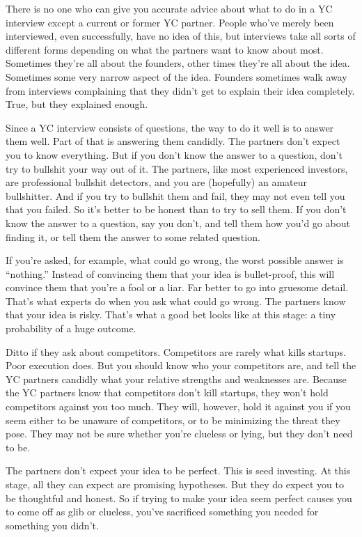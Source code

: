 There is no one who can give you accurate advice about what to do in a
YC interview except a current or former YC partner. People who've merely
been interviewed, even successfully, have no idea of this, but
interviews take all sorts of different forms depending on what the
partners want to know about most. Sometimes they're all about the
founders, other times they're all about the idea. Sometimes some very
narrow aspect of the idea. Founders sometimes walk away from interviews
complaining that they didn't get to explain their idea completely. True,
but they explained enough.

Since a YC interview consists of questions, the way to do it well is to
answer them well. Part of that is answering them candidly. The partners
don't expect you to know everything. But if you don't know the answer to
a question, don't try to bullshit your way out of it. The partners, like
most experienced investors, are professional bullshit detectors, and you
are (hopefully) an amateur bullshitter. And if you try to bullshit them
and fail, they may not even tell you that you failed. So it's better to
be honest than to try to sell them. If you don't know the answer to a
question, say you don't, and tell them how you'd go about finding it, or
tell them the answer to some related question.

If you're asked, for example, what could go wrong, the worst possible
answer is ``nothing.'' Instead of convincing them that your idea is
bullet-proof, this will convince them that you're a fool or a liar. Far
better to go into gruesome detail. That's what experts do when you ask
what could go wrong. The partners know that your idea is risky. That's
what a good bet looks like at this stage: a tiny probability of a huge
outcome.

Ditto if they ask about competitors. Competitors are rarely what kills
startups. Poor execution does. But you should know who your competitors
are, and tell the YC partners candidly what your relative strengths and
weaknesses are. Because the YC partners know that competitors don't kill
startups, they won't hold competitors against you too much. They will,
however, hold it against you if you seem either to be unaware of
competitors, or to be minimizing the threat they pose. They may not be
sure whether you're clueless or lying, but they don't need to be.

The partners don't expect your idea to be perfect. This is seed
investing. At this stage, all they can expect are promising hypotheses.
But they do expect you to be thoughtful and honest. So if trying to make
your idea seem perfect causes you to come off as glib or clueless,
you've sacrificed something you needed for something you didn't.

